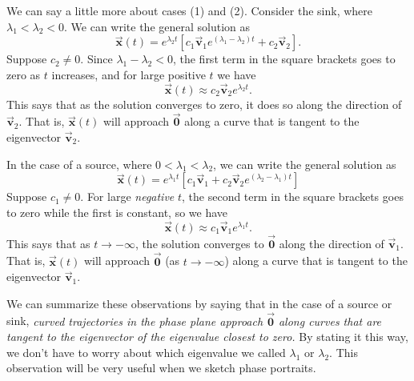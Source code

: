 \documentclass[reqno]{immbook}
\newcommand{\BV}{\vec{\textbf{v}}}
\newcommand{\BX}{\vec{\textbf{x}}}
\newcommand{\BZero}{\vec{\textbf{0}}}  %
\numberwithin{equation}{chapter}
\numberwithin{question}{section}
\numberwithin{theorem}{chapter}
\numberwithin{figure}{chapter}
\theoremstyle{definition}
\begin{document}
We can say a little more about cases (1) and (2).
Consider the sink, where $\lambda_1 < \lambda_2 < 0$.
We can write the general solution as
\begin{equation}
\BX(t) = e^{\lambda_2 t}\left[c_1\BV_1 e^{(\lambda_1-\lambda_2)t} + c_2\BV_2\right] . 
\end{equation} 
Suppose $c_2\ne 0$.
Since $\lambda_1-\lambda_2 < 0$, the first term in the
square brackets goes to zero as $t$ increases,
and for large positive $t$ we have
\begin{equation}
  \BX(t) \approx c_2\BV_2 e^{\lambda_2 t}.
\end{equation}
This says that as the solution converges to zero, it does
so along the direction of $\BV_2$.
That is, $\BX(t)$ will approach $\BZero$ along a curve that
is tangent to the eigenvector $\BV_2$.

In the case of a source, where $0 < \lambda_1 < \lambda_2$,
we can write the general solution as
\begin{equation}
\BX(t) = e^{\lambda_1 t}\left[c_1\BV_1 + c_2\BV_2 e^{(\lambda_2-\lambda_1)t}\right] 
\end{equation}
Suppose $c_1\ne 0$.
For large \emph{negative} $t$, the second term in the
square brackets goes to zero while the first is constant, so we have
\begin{equation}
 \BX(t) \approx c_1 \BV_1 e^{\lambda_1 t}.
\end{equation}
This says that
as $t\rightarrow-\infty$, the solution converges to
$\BZero$ along the direction of $\BV_1$.  That is,
$\BX(t)$ will approach $\BZero$ (as $t\rightarrow-\infty$)
along a curve that is tangent to the eigenvector
$\BV_1$.

We can summarize these observations by saying
that in the case of a source or sink,
\emph{curved trajectories in the phase plane approach
$\BZero$ along curves that are tangent to the eigenvector
of the eigenvalue closest to zero.}
By stating it this way, we don't have to worry
about which eigenvalue we called $\lambda_1$ or
$\lambda_2$.  This observation will be very useful
when we sketch phase portraits.
\end{document}
